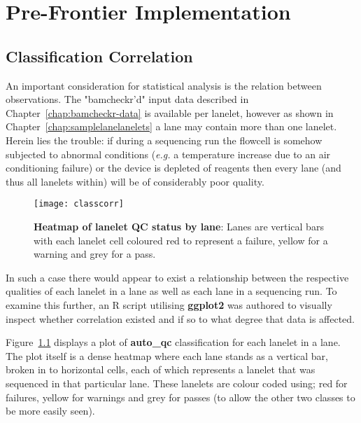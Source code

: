 \chapter{Pre-Frontier Implementation}
\label{app:pre-frontier}

\ifpdf
    \graphicspath{{Chapter2/Figs/Raster/}{Chapter2/Figs/PDF/}{Chapter2/Figs/}}
\else
    \graphicspath{{Chapter2/Figs/Vector/}{Chapter2/Figs/}}
\fi
\section{Classification Correlation}

An important consideration for statistical analysis is the relation between
observations. The "bamcheckr'd" input data described in
Chapter~\ref{chap:bamcheckr-data} is available per lanelet, however as shown in
Chapter~\ref{chap:samplelanelanelets} a lane may contain more than one lanelet.
Herein lies the trouble: if during a sequencing run the flowcell is somehow
subjected to abnormal conditions (\textit{e.g.} a temperature increase due to an air
conditioning failure) or the device is depleted of reagents then every lane (and
thus all lanelets within) will be of considerably poor quality.

\begin{figure}[htbp!]
    \centering
    \texttt{[image: classcorr]}
    \caption[ClassCorr]{\textbf{Heatmap of lanelet QC status by lane}: Lanes are
    vertical bars with each lanelet cell coloured red to represent a failure,
yellow for a warning and grey for a pass.}
    \label{fig:classcorr}
\end{figure}

In such a case there would appear to exist a relationship between the respective
qualities of each lanelet in a lane as well as each lane in a sequencing run. To
examine this further, an R script utilising \textbf{ggplot2} was authored to
visually inspect whether correlation existed and if so to what degree that data
is affected.

Figure~\ref{fig:classcorr} displays a plot of \textbf{auto\_qc} classification
for each lanelet in a lane. The plot itself is a dense heatmap
where each lane stands as a vertical bar, broken in to horizontal cells, each
of which represents a lanelet that was sequenced in that particular lane. These
lanelets are colour coded using; red for failures, yellow for warnings and grey
for passes (to allow the other two classes to be more easily seen).

